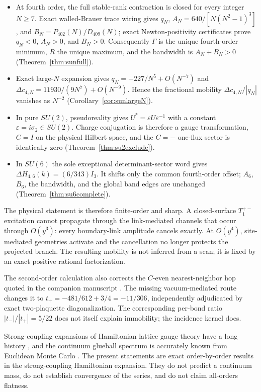 \documentclass[11pt]{article}
\begin{document}
\begin{itemize}
closed-surface second-order branch is universally flat
(Theorem~\ref{thm:suniversal}).
\item[(J)] At fourth order, the full stable-rank contraction is closed for
every integer $N\geq7$. Exact walled-Brauer trace wiring gives
$q_N$, $A_N=640/[N(N^2-1)^3]$, and $B_N=P_{402}(N)/D_{409}(N)$; exact
Newton-positivity certificates prove $q_N<0$, $A_N>0$, and $B_N>0$.
Consequently $\Gamma$ is the unique fourth-order minimum, $R$ the unique
maximum, and the bandwidth is $A_N+B_N>0$
(Theorem~\ref{thm:sunfull}).
\item[(K)] Exact large-$N$ expansion gives
$q_N=-227/N^5+O(N^{-7})$ and
$\Delta c_{4,N}=11930/(9N^7)+O(N^{-9})$. Hence the fractional mobility
$\Delta c_{4,N}/|q_N|$ vanishes as $N^{-2}$
(Corollary~\ref{cor:sunlargeN}).
\item[(L)] In pure $SU(2)$, pseudoreality gives
$U^*=\varepsilon U\varepsilon^{-1}$ with a constant
$\varepsilon=i\sigma_2\in SU(2)$. Charge conjugation is therefore a gauge
transformation, $C=I$ on the physical Hilbert space, and the $C=-$ one-flux
sector is identically zero (Theorem~\ref{thm:su2exclude}).
\item[(M)] In $SU(6)$ the sole exceptional determinant-sector word gives
$\Delta H_{4,6}(k)=(6/343)I_3$. It shifts only the common fourth-order offset;
$A_6$, $B_6$, the bandwidth, and the global band edges are unchanged
(Theorem~\ref{thm:su6complete}).
\end{itemize}

The physical statement is therefore finite-order and sharp. A closed-surface
$T_1^{+-}$ excitation cannot propagate through the link-mediated channels
that occur through $O(y^3)$: every boundary-link amplitude cancels exactly.
At $O(y^4)$, site-mediated geometries activate and the cancellation no longer
protects the projected branch. The resulting mobility is not inferred from a
scan; it is fixed by an exact positive rational factorization.

The second-order calculation also corrects the $C$-even nearest-neighbor hop
quoted in the companion manuscript \cite{companion}. The missing
vacuum-mediated route changes it to
$t_+=-481/612+3/4=-11/306$, independently adjudicated by exact
two-plaquette diagonalization. The corresponding per-bond ratio
$|t_-|/|t_+|=5/22$ does not itself explain immobility; the incidence kernel
does.

Strong-coupling expansions of Hamiltonian lattice gauge theory have a long
history \cite{KogutSusskind1975,Banksetal1977,KogutSinclairSusskind1976,
Creutz1983}, and the continuum glueball spectrum is accurately known from
Euclidean Monte Carlo \cite{MorningstarPeardon1999,AthenodorouTeper2020}.
The present statements are exact order-by-order results in the
strong-coupling Hamiltonian expansion. They do not predict a continuum mass,
do not establish convergence of the series, and do not claim all-orders
flatness.
\end{document}
